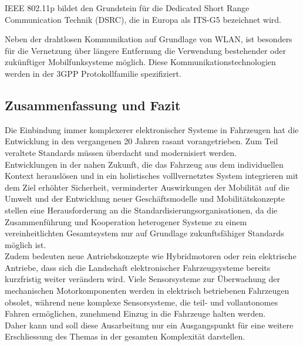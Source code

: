     IEEE 802.11p bildet den Grundstein für die Dedicated Short Range Communication Technik (DSRC), die in Europa als ITS-G5 bezeichnet wird. 
    
    Neben der drahtlosen Kommunikation auf Grundlage von WLAN, ist besonders für die Vernetzung über längere Entfernung die Verwendung bestehender oder zukünftiger Mobilfunksysteme möglich.
    Diese Kommunikationstechnologien werden in der 3GPP Protokollfamilie spezifiziert.

   
    \subsection{Zusammenfassung und Fazit}
    Die Einbindung immer komplexerer elektronischer Systeme in Fahrzeugen hat die Entwicklung in den vergangenen
    20 Jahren rasant vorangetrieben. Zum Teil veraltete Standards müssen überdacht und modernisiert werden.\\
    Entwicklungen in der nahen Zukunft, die das Fahrzeug aus dem individuellen Kontext herauslösen und in ein holistisches volllvernetztes
    System integrieren mit dem Ziel erhöhter Sicherheit, verminderter Auswirkungen der Mobilität auf die Umwelt und der Entwicklung neuer Geschäftsmodelle
    und Mobilitätskonzepte stellen eine Herausforderung an die Standardisierungsorganisationen, da die Zusammenführung und Kooperation heterogener Systeme zu einem
    vereinheitlichten Gesamtsystem nur auf Grundlage zukunftsfähiger Standards möglich ist.\\
    
    Zudem bedeuten neue Antriebskonzepte wie Hybridmotoren oder rein elektrische Antriebe, dass sich die Landschaft elektronischer Fahrzeugsysteme bereits kurzfristig 
    weiter verändern wird. Viele Sensorsysteme zur Überwachung der mechanischen Motorkomponenten werden in elektrisch betriebenen Fahrzeugen obsolet, während
    neue komplexe Sensorsysteme, die teil- und vollautonomes Fahren ermöglichen, zunehmend Einzug in die Fahrzeuge halten werden.\\

    Daher kann und soll diese Ausarbeitung nur ein Ausgangspunkt für eine weitere Erschliessung des Themas in der gesamten Komplexität darstellen.
